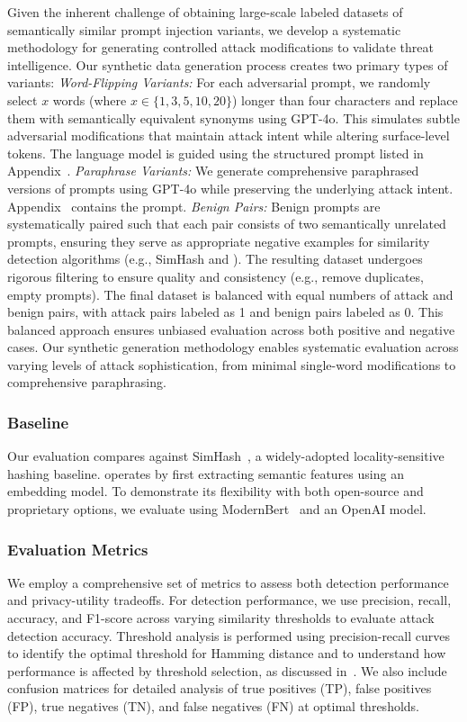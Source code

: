 Given the inherent challenge of obtaining large-scale labeled datasets of semantically similar prompt injection variants, we develop a systematic methodology for generating controlled attack modifications to validate threat intelligence.
Our synthetic data generation process creates two primary types of variants: \emph{Word-Flipping Variants:} For each adversarial prompt, we randomly select $x$ words (where $x \in \{1, 3, 5, 10, 20\}$) longer than four characters and replace them with semantically equivalent synonyms using GPT-4o.
This simulates subtle adversarial modifications that maintain attack intent while altering surface-level tokens.
The language model is guided using the structured prompt listed in Appendix~.
\emph{Paraphrase Variants:} We generate comprehensive paraphrased versions of prompts using GPT-4o while preserving the underlying attack intent. 
Appendix~ contains the prompt.
\emph{Benign Pairs:} Benign prompts are systematically paired such that each pair consists of two semantically unrelated prompts, ensuring they serve as appropriate negative examples for similarity detection algorithms (e.g., SimHash and \tool).
%
The resulting dataset undergoes rigorous filtering to ensure quality and consistency (e.g., remove duplicates, empty prompts).
The final dataset is balanced with equal numbers of attack and benign pairs, with attack pairs labeled as 1 and benign pairs labeled as 0.
This balanced approach ensures unbiased evaluation across both positive and negative cases.
%
Our synthetic generation methodology enables systematic evaluation across varying levels of attack sophistication, from minimal single-word modifications to comprehensive paraphrasing.

\subsubsection{Baseline}

Our evaluation compares \tool against SimHash~\cite{manku2007detecting}, a widely-adopted locality-sensitive hashing baseline.
\tool operates by first extracting semantic features using an embedding model. 
To demonstrate its flexibility with both open-source and proprietary options, we evaluate \tool using ModernBert~\cite{gill2025advancingsemanticcachingllms} and an OpenAI model. 



\subsubsection{Evaluation Metrics}
We employ a comprehensive set of metrics to assess both detection performance and privacy-utility tradeoffs. For detection performance, we use precision, recall, accuracy, and F1-score across varying similarity thresholds to evaluate attack detection accuracy. Threshold analysis is performed using precision-recall curves to identify the optimal threshold for Hamming distance and to understand how performance is affected by threshold selection, as discussed in~\cite{manku2007detecting}. We also include confusion matrices for detailed analysis of true positives (TP), false positives (FP), true negatives (TN), and false negatives (FN) at optimal thresholds.

